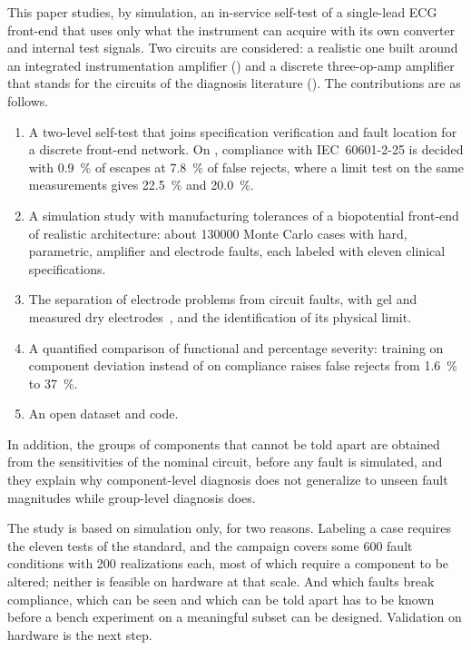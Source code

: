 This paper studies, by simulation, an in-service self-test of a single-lead ECG front-end that
uses only what the instrument can acquire with its own converter and internal test signals. Two
circuits are considered: a realistic one built around an integrated instrumentation amplifier
(\cA) and a discrete three-op-amp amplifier that stands for the circuits of the diagnosis
literature (\cB). The contributions are as follows.
\begin{enumerate}
\item A two-level self-test that joins specification verification and fault location for a
discrete front-end network. On \cA, compliance with IEC~60601-2-25 is decided with
\SI{0.9}{\percent} of escapes at \SI{7.8}{\percent} of false rejects, where a limit test on the
same measurements gives \SI{22.5}{\percent} and \SI{20.0}{\percent}.
\item A simulation study with manufacturing tolerances of a biopotential front-end of realistic
architecture: about \num{130000} Monte Carlo cases with hard, parametric, amplifier and electrode
faults, each labeled with eleven clinical specifications.
\item The separation of electrode problems from circuit faults, with gel and measured dry
electrodes~\cite{iec60601225,joutsen2024}, and the identification of its physical limit.
\item A quantified comparison of functional and percentage severity: training on component
deviation instead of on compliance raises false rejects from \SI{1.6}{\percent} to
\SI{37}{\percent}.
\item An open dataset and code.
\end{enumerate}
In addition, the groups of components that cannot be told apart are obtained from the
sensitivities of the nominal circuit, before any fault is simulated, and they explain why
component-level diagnosis does not generalize to unseen fault magnitudes while group-level
diagnosis does.

The study is based on simulation only, for two reasons. Labeling a case requires the eleven
tests of the standard, and the campaign covers some 600 fault conditions with 200 realizations
each, most of which require a component to be altered; neither is feasible on hardware at that
scale. And which faults break compliance, which can be seen and which can be told apart has to
be known before a bench experiment on a meaningful subset can be designed. Validation on hardware
is the next step.
